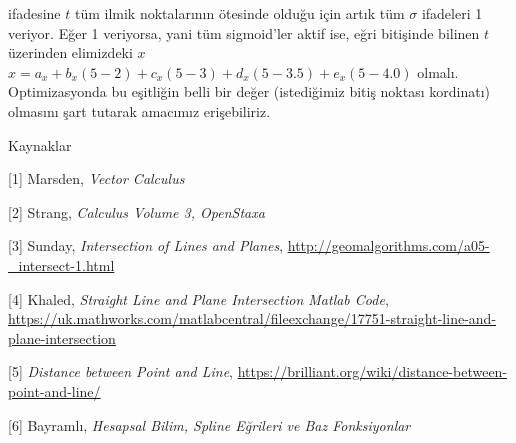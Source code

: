 \documentclass[12pt,fleqn]{article}\usepackage{../../common}
\begin{document}
ifadesine $t$ tüm ilmik noktalarının ötesinde olduğu için artık tüm
$\sigma$ ifadeleri 1 veriyor. Eğer 1 veriyorsa, yani tüm sigmoid'ler aktif
ise, eğri bitişinde bilinen $t$ üzerinden elimizdeki $x$ 
$x = a_x + b_x(5-2) + c_x(5-3) + d_x(5-3.5) + e_x(5-4.0)$
olmalı. Optimizasyonda bu eşitliğin belli bir değer (istediğimiz bitiş
noktası kordinatı) olmasını şart tutarak amacımız erişebiliriz.

Kaynaklar

[1] Marsden, {\em Vector Calculus}

[2] Strang, {\em Calculus Volume 3, OpenStaxa}

[3] Sunday, {\em Intersection of Lines and Planes}, 
\url{http://geomalgorithms.com/a05-_intersect-1.html}

[4] Khaled, {\em Straight Line and Plane Intersection Matlab Code}, 
\url{https://uk.mathworks.com/matlabcentral/fileexchange/17751-straight-line-and-plane-intersection}

[5] {\em Distance between Point and Line}, 
\url{https://brilliant.org/wiki/distance-between-point-and-line/}

[6] Bayramlı, {\em Hesapsal Bilim, Spline Eğrileri ve Baz Fonksiyonlar}
\end{document}
